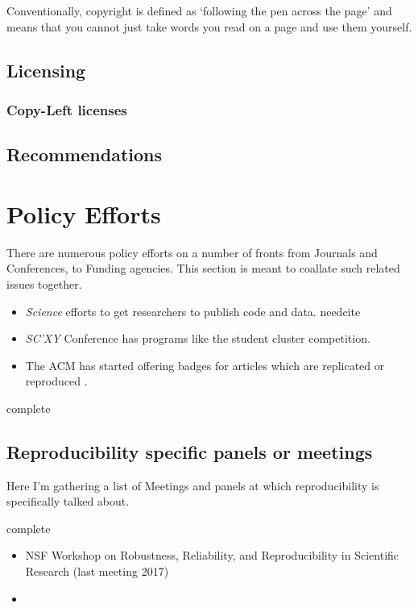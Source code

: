 \documentclass[american]{article}
\newcommand{\complete}{
	\gls{complete}
}
\newcommand{\needcite}{
	\gls{needcite}
}
\begin{document}
Conventionally, copyright is defined as `following the pen across the page' and means that you cannot just take words you read on a page and use them yourself.

\subsection{Licensing} \label{sec:legal-licensing}

\subsubsection{Copy-Left licenses} \label{sec:legal-licensing-left}

\subsection{Recommendations} \label{sec:legal-recommendations}

\section{Policy Efforts} \label{sec:policy}

There are numerous policy efforts on a number of fronts from Journals and Conferences, to Funding agencies. This section is meant to coallate such related issues together.

\begin{itemize}
\item \textit{Science} efforts to get researchers to publish code and data. \needcite
\item \textit{SC'XY} Conference has programs like the student cluster competition. \cite{sighpc-connect-repro-1,sighpc-connect-repro-2}
\item The ACM has started offering badges for articles which are replicated or reproduced \cite{acm-badging-announcement}.
\end{itemize}

\complete

\subsection{Reproducibility specific panels or meetings} \label{sec:policy-panels}

Here I'm gathering a list of Meetings and panels at which reproducibility is specifically talked about.

\complete

\begin{itemize}
\item NSF Workshop on Robustness, Reliability, and Reproducibility in Scientific Research (last meeting 2017)
\item
\end{itemize}
\end{document}
